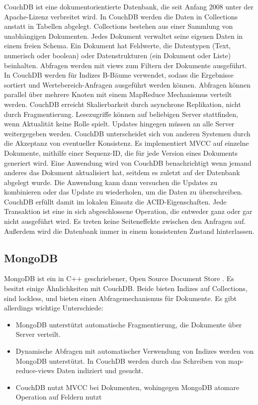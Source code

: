 CouchDB \cite{couch2013} ist eine dokumentorientierte Datenbank, die seit Anfang 2008 unter der  Apache-Lizenz verbreitet wird. In CouchDB werden die Daten in Collections anstatt in Tabellen abgelegt. Collections bestehen aus einer Sammlung von unabhängigen Dokumenten. Jedes Dokument verwaltet seine eigenen Daten in einem freien Schema. 
Ein Dokument hat Feldwerte, die Datentypen (Text, numerisch oder boolean) oder Datenstrukturen (ein Dokument oder Liste) beinhalten. Abfragen werden mit views zum Filtern der Dokumente ausgeführt. In CouchDB werden für Indizes B-Bäume verwendet, sodass die Ergebnisse sortiert und Wertebereich-Anfragen ausgeführt werden können. Abfragen können parallel über mehrere Knoten mit einem MapReduce Mechanismus verteilt werden. CouchDB erreicht Skalierbarkeit durch asynchrone Replikation, nicht durch Fragmentierung. Lesezugriffe können auf beliebigen Server stattfinden, wenn Aktualität keine Rolle spielt. Updates hingegen müssen an alle Server weitergegeben werden.
CouchDB unterscheidet sich von anderen Systemen durch die Akzeptanz von eventueller Konsistenz. Es implementiert MVCC auf einzelne Dokumente, mithilfe einer Sequenz-ID, die für jede Version eines Dokuments generiert wird. Eine Anwendung wird von CouchDB benachrichtigt wenn jemand anderes das Dokument aktualisiert hat, seitdem es zuletzt auf der Datenbank abgelegt wurde. Die Anwendung kann dann versuchen die Updates zu kombinieren oder das Update zu wiederholen, um die Daten zu überschreiben. CouchDB erfüllt damit im lokalen Einsatz die ACID-Eigenschaften. Jede Transaktion ist eine in sich abgeschlossene Operation, die entweder ganz oder gar nicht ausgeführt wird. Es treten keine Seiteneffekte zwischen den Anfragen auf. Außerdem wird die Datenbank immer in einem konsistenten Zustand hinterlassen.

\subsection{MongoDB}
\label{ch:AnalyseDatenbanken:sec:Datenbanken:subsec:MongoDB}

MongoDB ist ein in C++ geschriebener, Open Source Document Store \cite{books/daglib/0025185}. Es besitzt einige Ähnlichkeiten mit CouchDB. Beide bieten Indizes auf Collections, sind lockless, und bieten einen Abfragemechanismus für Dokumente. Es gibt allerdings wichtige Unterschiede:

\begin{itemize}

	\item MongoDB unterstützt automatische Fragmentierung, die Dokumente über Server verteilt.
	\item Dynamische Abfragen mit automatischer Verwendung von Indizes werden von MongoDB unterstützt. In CouchDB werden durch das Schreiben von map-reduce-views Daten indiziert und gesucht.
	\item CouchDB nutzt MVCC bei Dokumenten, wohingegen MongoDB atomare Operation auf Feldern nutzt   

\end{itemize}

